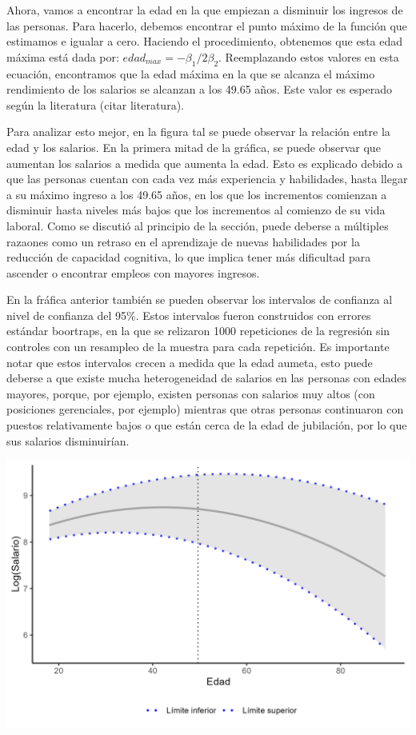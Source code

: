 \documentclass[
  11pt,
  letterpaper,
]{article}
\begin{document}
Ahora, vamos a encontrar la edad en la que empiezan a disminuir los
ingresos de las personas. Para hacerlo, debemos encontrar el punto
máximo de la función que estimamos e igualar a cero. Haciendo el
procedimiento, obtenemos que esta edad máxima está dada por:
\(edad_{max}=-\beta_1/2\beta_2\). Reemplazando estos valores en esta
ecuación, encontramos que la edad máxima en la que se alcanza el máximo
rendimiento de los salarios se alcanzan a los 49.65 años. Este valor es
esperado según la literatura (citar literatura).

Para analizar esto mejor, en la figura tal se puede observar la relación
entre la edad y los salarios. En la primera mitad de la gráfica, se
puede observar que aumentan los salarios a medida que aumenta la edad.
Esto es explicado debido a que las personas cuentan con cada vez más
experiencia y habilidades, hasta llegar a su máximo ingreso a los 49.65
años, en los que los incrementos comienzan a disminuir hasta niveles más
bajos que los incrementos al comienzo de su vida laboral. Como se
discutió al principio de la sección, puede deberse a múltiples razaones
como un retraso en el aprendizaje de nuevas habilidades por la reducción
de capacidad cognitiva, lo que implica tener más dificultad para
ascender o encontrar empleos con mayores ingresos.

En la fráfica anterior también se pueden observar los intervalos de
confianza al nivel de confianza del 95\%. Estos intervalos fueron
construidos con errores estándar boortraps, en la que se relizaron 1000
repeticiones de la regresión sin controles con un resampleo de la
muestra para cada repetición. Es importante notar que estos intervalos
crecen a medida que la edad aumeta, esto puede deberse a que existe
mucha heterogeneidad de salarios en las personas con edades mayores,
porque, por ejemplo, existen personas con salarios muy altos (con
posiciones gerenciales, por ejemplo) mientras que otras personas
continuaron con puestos relativamente bajos o que están cerca de la edad
de jubilación, por lo que sus salarios disminuirían.

\includegraphics[width=25in]{../views/age_earnings_plot}
\end{document}
